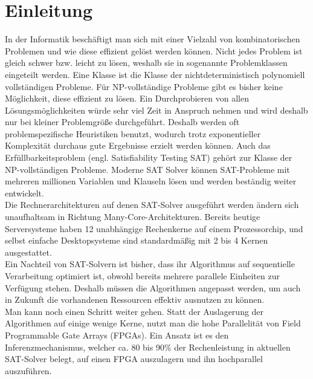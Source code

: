 \section{Einleitung}

In der Informatik beschäftigt man sich mit einer Vielzahl von
kombinatorischen Problemen und wie diese effizient gelöst werden können.
Nicht jedes Problem ist gleich schwer bzw. leicht zu lösen, weshalb sie in
sogenannte Problemklassen eingeteilt werden.  Eine Klasse ist die Klasse der
nichtdeterministisch polynomiell vollständigen Probleme. Für NP-vollständige Probleme gibt es bisher
keine Möglichkeit, diese effizient zu lösen. Ein Durchprobieren von
allen Lösungsmöglichkeiten würde sehr viel Zeit in Anspruch nehmen und
wird deshalb nur bei kleiner Problemgröße durchgeführt. Deshalb
werden oft problemspezifische Heuristiken benutzt, wodurch trotz
exponentieller Komplexität durchaus gute Ergebnisse erzielt werden
können.  Auch das Erfüllbarkeitsproblem (engl. Satisfiability Testing SAT)
gehört zur Klasse der NP-vollständigen Probleme. Moderne SAT Solver
können SAT-Probleme mit mehreren millionen Variablen und Klauseln
lösen und werden beständig weiter entwickelt.\\ Die
Rechnerarchitekturen auf denen SAT-Solver ausgeführt werden ändern
sich unaufhaltsam in Richtung Many-Core-Architekturen. Bereits heutige
Serversysteme haben 12 unabhängige Rechenkerne \cite{amdopteron:2011} auf einem
Prozessorchip, und selbst einfache Desktopsysteme sind standardmäßig
mit 2 bis 4 Kernen ausgestattet.\\ Ein Nachteil von SAT-Solvern ist
bisher, dass ihr Algorithmus auf sequentielle Verarbeitung
optimiert ist, obwohl bereits mehrere parallele Einheiten zur Verfügung
stehen.  Deshalb müssen die Algorithmen angepasst werden, um
auch in Zukunft die vorhandenen Ressourcen effektiv ausnutzen zu können.\\ Man
kann noch einen Schritt weiter gehen. Statt der Auslagerung der Algorithmen
auf einige wenige Kerne, nutzt man die hohe Parallelität
von Field Programmable Gate Arrays (FPGAs).  Ein Ansatz ist es den
Inferenzmechanismus, welcher ca. 80 bis 90\% der Rechenleistung in
aktuellen SAT-Solver belegt, auf einen FPGA auszulagern und 
ihn hochparallel auszuführen.\\

